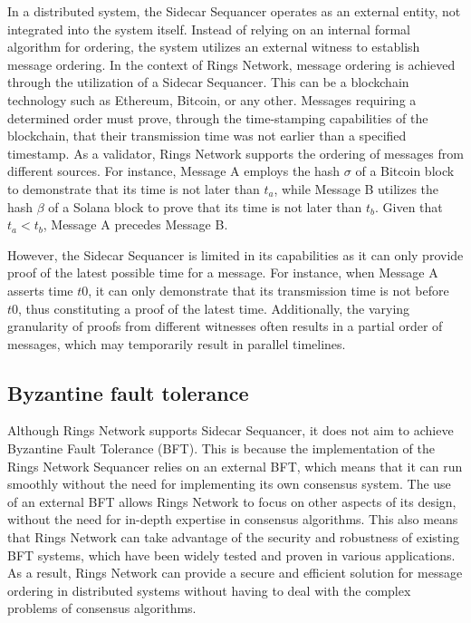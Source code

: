 \documentclass[twocolumn]{article}
\begin{document}
In a distributed system, the Sidecar Sequancer operates as an external entity, not integrated into the system itself. Instead of relying on an internal formal algorithm for ordering, the system utilizes an external witness to establish message ordering.
In the context of Rings Network, message ordering is achieved through the utilization of a Sidecar Sequancer. This can be a blockchain technology such as Ethereum, Bitcoin, or any other. Messages requiring a determined order must prove, through the time-stamping capabilities of the blockchain, that their transmission time was not earlier than a specified timestamp.
As a validator, Rings Network supports the ordering of messages from different sources. For instance, Message A employs the hash $\sigma$ of a Bitcoin block to demonstrate that its time is not later than $t_a$, while Message B utilizes the hash $\beta$ of a Solana block to prove that its time is not later than $t_b$. Given that $t_a < t_b$, Message A precedes Message B.

However, the Sidecar Sequancer is limited in its capabilities as it can only provide proof of the latest possible time for a message. For instance, when Message A asserts time $t0$, it can only demonstrate that its transmission time is not before $t0$, thus constituting a proof of the latest time. Additionally, the varying granularity of proofs from different witnesses often results in a partial order of messages, which may temporarily result in parallel timelines.


\subsection{Byzantine fault tolerance}
Although Rings Network supports Sidecar Sequancer, it does not aim to achieve Byzantine Fault Tolerance (BFT). This is because the implementation of the Rings Network Sequancer relies on an external BFT, which means that it can run smoothly without the need for implementing its own consensus system. The use of an external BFT allows Rings Network to focus on other aspects of its design, without the need for in-depth expertise in consensus algorithms. This also means that Rings Network can take advantage of the security and robustness of existing BFT systems, which have been widely tested and proven in various applications. As a result, Rings Network can provide a secure and efficient solution for message ordering in distributed systems without having to deal with the complex problems of consensus algorithms.
\end{document}
